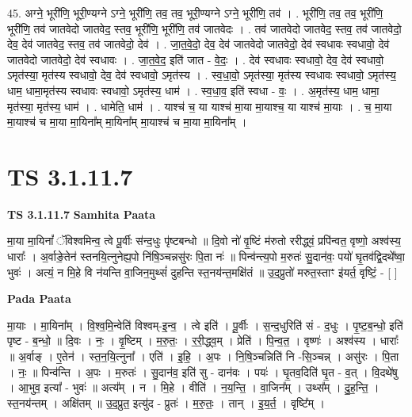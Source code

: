 \documentclass[17pt]{extarticle}
\begin{document}
45. अग्ने॒ भूरी॑णि॒ भूरी॒ण्यग्ने ऽग्ने॒ भूरी॑णि॒ तव॒ तव॒ भूरी॒ण्यग्ने ऽग्ने॒ भूरी॑णि॒ तव॑ । . भूरी॑णि॒ तव॒ तव॒ भूरी॑णि॒ भूरी॑णि॒ तव॑ जातवेदो जातवेद॒ स्तव॒ भूरी॑णि॒ भूरी॑णि॒ तव॑ जातवेदः । . तव॑ जातवेदो जातवेद॒ स्तव॒ तव॑ जातवेदो॒ देव॒ देव॑ जातवेद॒ स्तव॒ तव॑ जातवेदो॒ देव॑ । . जा॒त॒वे॒दो॒ देव॒ देव॑ जातवेदो जातवेदो॒ देव॑ स्वधावः स्वधावो॒ देव॑ जातवेदो जातवेदो॒ देव॑ स्वधावः । . जा॒त॒वे॒द॒ इति॑ जात - वे॒दः॒ । . देव॑ स्वधावः स्वधावो॒ देव॒ देव॑ स्वधावो॒ ऽमृत॑स्या॒ मृत॑स्य स्वधावो॒ देव॒ देव॑ स्वधावो॒ ऽमृत॑स्य । . स्व॒धा॒वो॒ ऽमृत॑स्या॒ मृत॑स्य स्वधावः स्वधावो॒ ऽमृत॑स्य॒ धाम॒ धामा॒मृत॑स्य स्वधावः स्वधावो॒ ऽमृत॑स्य॒ धाम॑ । . स्व॒धा॒व॒ इति॑ स्वधा - वः॒ । . अ॒मृत॑स्य॒ धाम॒ धामा॒ मृत॑स्या॒ मृत॑स्य॒ धाम॑ । . धामेति॒ धाम॑ । . याश्च॑ च॒ या याश्च॑ मा॒या मा॒याश्च॒ या याश्च॑ मा॒याः । . च॒ मा॒या मा॒याश्च॑ च मा॒या मा॒यिना᳚म् मा॒यिना᳚म् मा॒याश्च॑ च मा॒या मा॒यिना᳚म् । \newline
\pagebreak
{}

\section{ TS 3.1.11.7 }

\textbf{TS 3.1.11.7 } \newline
\textbf{Samhita Paata} \newline

मा॒या मा॒यिनां᳚ ॅविश्वमिन्व॒ त्वे पू॒र्वीः स॑न्द॒धुः पृ॑ष्टबन्धो ॥ दि॒वो नो॑ वृ॒ष्टिं म॑रुतो ररीद्ध्वं॒ प्रपि॑न्वत॒ वृष्णो॒ अश्व॑स्य॒ धाराः᳚ । अ॒र्वाङे॒तेन॑ स्तनयि॒त्नुनेह्य॒पो नि॑षि॒ञ्चन्नसु॑रः पि॒ता नः॑ ॥ पिन्व॑न्त्य॒पो म॒रुतः॑ सु॒दान॑वः॒ पयो॑ घृ॒तव॑द्वि॒दथे᳚ष्वा॒ भुवः॑ । अत्यं॒ न मि॒हे वि न॑यन्ति वा॒जिन॒मुथ्सं॑ दुहन्ति स्त॒नय॑न्त॒मक्षि॑तं ॥ उ॒द॒प्रुतो॑ मरुत॒स्ताꣳ इ॑यर्त॒ वृष्टिं॒ - [  ] \newline

\textbf{Pada Paata} \newline

मा॒याः । मा॒यिना᳚म् । वि॒श्व॒मि॒न्वेति॑ विश्वम्-इ॒न्व॒ । त्वे इति॑ । पू॒र्वीः । स॒न्द॒धुरिति॑ सं - द॒धुः । पृ॒ष्ट॒ब॒न्धो॒ इति॑ पृष्ट - ब॒न्धो॒ ॥ दि॒वः । नः॒ । वृ॒ष्टिम् । म॒रु॒तः॒ । र॒री॒द्ध्व॒म् । प्रेति॑ । पि॒न्व॒त॒ । वृष्णः॑ । अश्व॑स्य । धाराः᳚ ॥ अ॒र्वाङ् । ए॒तेन॑ । स्त॒न॒यि॒त्नुना᳚ । एति॑ । इ॒हि॒ । अ॒पः । नि॒षि॒ञ्चन्निति॑ नि -सि॒ञ्चन्न् । असु॑रः । पि॒ता । नः॒ ॥ पिन्व॑न्ति । अ॒पः । म॒रुतः॑ । सु॒दान॑व॒ इति॑ सु - दान॑वः । पयः॑ । घृ॒तव॒दिति॑ घृ॒त - व॒त् । वि॒दथे॑षु । आ॒भुव॒ इत्या᳚ - भुवः॑ ॥ अत्य᳚म् । न । मि॒हे । वीति॑ । न॒य॒न्ति॒ । वा॒जिन᳚म् । उथ्स᳚म् । दु॒ह॒न्ति॒ । स्त॒नय॑न्तम् । अक्षि॑तम् ॥ उ॒द॒प्रुत॒ इत्यु॑द - प्रुतः॑ । म॒रु॒तः॒ । तान् । इ॒य॒र्त॒ । वृष्टि᳚म् ।  \newline
\end{document}
